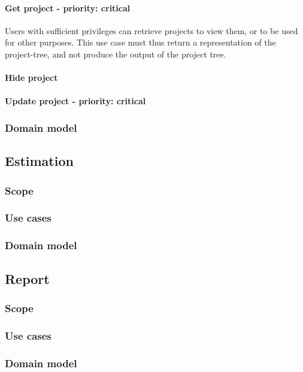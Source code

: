 \paragraph{Get project - priority: critical}
Users with sufficient privileges can retrieve projects to view them, or to be used for other purposes. This use case must thus return a representation of the project-tree, and not produce the output of the project tree.

\paragraph{Hide project}
\paragraph{Update project - priority: critical}


\subsubsection{Domain model}

\subsection{Estimation}
\subsubsection{Scope}
\subsubsection{Use cases}
\subsubsection{Domain model}
\subsection{Report}
\subsubsection{Scope}
\subsubsection{Use cases}
\subsubsection{Domain model}
